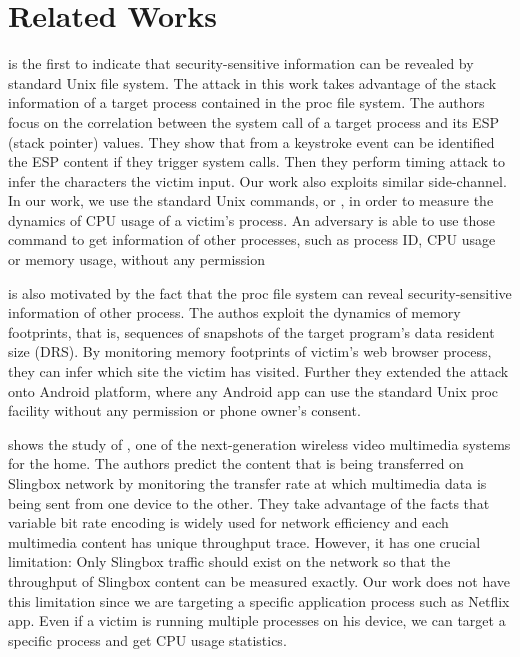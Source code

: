 \section{Related Works}
\label{sec:relatedworks}

\cite{Zhang:2009} is the first to indicate that security-sensitive information can be revealed by standard Unix  file system. 
The attack in this work takes advantage of the stack information of a target process contained in the proc file system. 
The authors focus on the correlation between the system call of a target process and its ESP (stack pointer) values. 
They show that from a keystroke event can be identified the ESP content if they trigger system calls.
Then they perform timing attack to infer the characters the victim input. 
Our work also exploits similar side-channel. 
In our work, we use the standard Unix commands,  or , in order to measure the dynamics of CPU usage of a victim's process. 
An adversary is able to use those command to get information of other processes, such as process ID, CPU usage or memory usage, without any permission 

\cite{jana:memento} is also motivated by the fact that the proc file system can reveal security-sensitive information of other process. 
The authos exploit the dynamics of memory footprints, that is, sequences of snapshots of the target program's data resident size (DRS).
By monitoring memory footprints of victim's web browser process, they can infer which site the victim has visited. 
Further they extended the attack onto Android platform, where any Android app can use the standard Unix proc facility without any permission or phone owner's consent. 

\cite{Saponas07devicesthat} shows the study of \cite{slingbox}, one of the next-generation wireless video multimedia systems for the home. 
The authors predict the content that is being transferred on Slingbox network by monitoring the transfer rate at which multimedia data is being sent from one device to the other. 
They take advantage of the facts that variable bit rate encoding is widely used for network efficiency and each multimedia content has unique throughput trace. 
However, it has one crucial limitation: Only Slingbox traffic should exist on the network so that the throughput of Slingbox content can be measured exactly. 
Our work does not have this limitation since we are targeting a specific application process such as Netflix app.
Even if a victim is running multiple processes on his device, we can target a specific process and get CPU usage statistics. 


